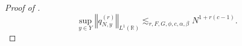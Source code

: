 \documentclass[reqno,12pt]{amsart}
\newcommand{\norm}[1]{\left\Vert #1\right\Vert}
\def \R {\mathbb R}
\numberwithin{equation}{section}
\begin{document}
\begin{proof}[Proof of ]
\begin{equation}
 \sup_{y\in Y}\norm{q_{N,y}^{(r)}}_{L^1(\R)}
 \lesssim_{r,F,G,\phi,c,\alpha,\beta}N^{1+r(c-1)}.
 \label{eq2-add-orbital-derivatives}
\end{equation}


\end{proof}
\end{document}

